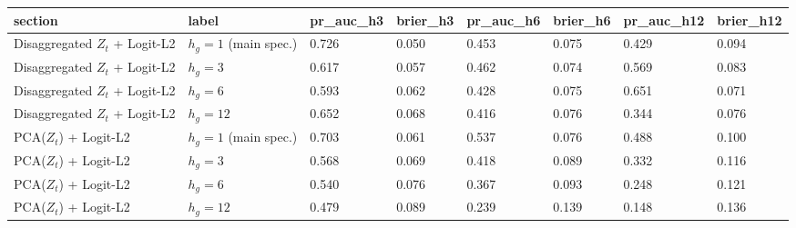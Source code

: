 \begin{tabular}{llllllll}
\toprule
section & label & pr_auc_h3 & brier_h3 & pr_auc_h6 & brier_h6 & pr_auc_h12 & brier_h12 \\
\midrule
Disaggregated $Z_t$ + Logit-L2 & $h_g=1$ (main spec.) & 0.726 & 0.050 & 0.453 & 0.075 & 0.429 & 0.094 \\
Disaggregated $Z_t$ + Logit-L2 & $h_g=3$ & 0.617 & 0.057 & 0.462 & 0.074 & 0.569 & 0.083 \\
Disaggregated $Z_t$ + Logit-L2 & $h_g=6$ & 0.593 & 0.062 & 0.428 & 0.075 & 0.651 & 0.071 \\
Disaggregated $Z_t$ + Logit-L2 & $h_g=12$ & 0.652 & 0.068 & 0.416 & 0.076 & 0.344 & 0.076 \\
PCA($Z_t$) + Logit-L2 & $h_g=1$ (main spec.) & 0.703 & 0.061 & 0.537 & 0.076 & 0.488 & 0.100 \\
PCA($Z_t$) + Logit-L2 & $h_g=3$ & 0.568 & 0.069 & 0.418 & 0.089 & 0.332 & 0.116 \\
PCA($Z_t$) + Logit-L2 & $h_g=6$ & 0.540 & 0.076 & 0.367 & 0.093 & 0.248 & 0.121 \\
PCA($Z_t$) + Logit-L2 & $h_g=12$ & 0.479 & 0.089 & 0.239 & 0.139 & 0.148 & 0.136 \\
\bottomrule
\end{tabular}
